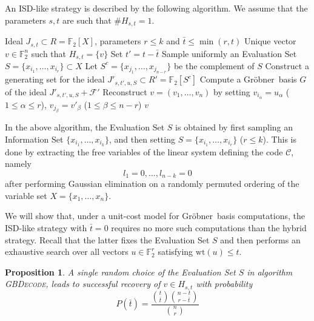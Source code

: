 \documentclass{amsart}
\newtheorem{proposition}[theorem]{Proposition}
\def\FF{{\mathbb F}}
\def\Gr{Gr\"obner}
\def\wt{{\mathrm{wt}}}
\def\GBDecode{{\textsc{GBDecode}}}
\def\cF{{\mathcal{F}}}
\def\cC{{\mathcal{C}}}
\def\bt{{\bar{t}}}
\begin{document}
An ISD-like strategy is described by the following algorithm. We assume that the parameters
$s,t$ are such that $\# H_{s,t} = 1$.

\begin{algorithm}[H]
\caption{\GBDecode}
\begin{algorithmic}[1]
\Require Ideal $J_{s,t}\subset R = \FF_2[X]$, parameters $r\leq k$ and $\bt \leq \min(r,t)$
\Ensure  \hspace{1pt} Unique vector $v\in\FF_2^n$ such that $H_{s,t} = \{v\}$
\State Set $t' = t - \bt$
  \State Sample uniformly an Evaluation Set $S = \{x_{i_1},\ldots,x_{i_r}\}\subset X$
  \State Let $S^c = \{x_{j_1},\ldots,x_{j_{n-r}}\}$ be the complement of $S$
  \For{\textbf{each} $u \in \FF_2^r$ with $\wt(u) = \bt$}
    \State Construct a generating set for the ideal $J'_{s,t',u,S}\subset R' = \FF_2[S^c]$ 
    \State Compute a \Gr\ basis $G$ of the ideal $J'_{s,t',u,S} + \cF'$
    \State Reconstruct $v = (v_1,\ldots,v_n)$ by setting
    \State \hspace{1em} $v_{i_\alpha} = u_\alpha$ ($1\leq\alpha\leq r$),
                        $v_{j_\beta} = v'_\beta$ ($1\leq\beta\leq n-r$)
    \State \Return $v$
    \EndIf
  \EndFor
\EndWhile
\end{algorithmic}
\end{algorithm}

In the above algorithm, the Evaluation Set $S$ is obtained by first sampling
an Information Set $\{x_{i_1},\ldots,x_{i_k}\}$, and then setting $S = \{x_{i_1},\ldots,x_{i_r}\}$
($r \leq k$). This is done by extracting the free variables of the linear system
defining the code $\cC$, namely
\[
l_1 = 0, \ldots, l_{n-k} = 0
\]
after performing Gaussian elimination on a randomly permuted ordering of the variable set
$X = \{x_1,\ldots,x_n\}$.

We will show that, under a unit-cost model for \Gr\ basis computations, the ISD-like strategy
with $\bt = 0$ requires no more such computations than the hybrid strategy.
Recall that the latter fixes the Evaluation Set $S$ and then performs an exhaustive search over
all vectors $u\in\FF_2^r$ satisfying $\wt(u)\leq t$.

\begin{proposition}
A single random choice of the Evaluation Set $S$ in algorithm \GBDecode,
leads to successful recovery of $v\in H_{s,t}$ with probability
\[
P(\bt) = \frac{\binom{t}{\bt}\binom{n-t}{r-\bt}}{\binom{n}{r}}
\]
\end{proposition}
\end{document}
